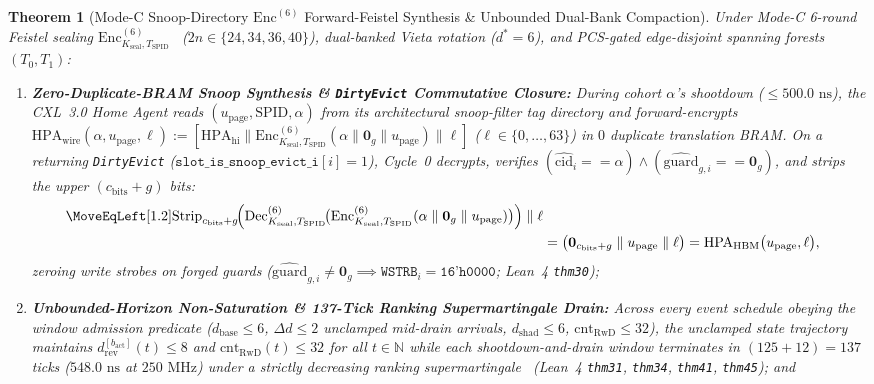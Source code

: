 \documentclass[11pt,letterpaper]{article}
\theoremstyle{spectralthm}
\newtheorem{theorem}{Theorem}[section]
\begin{document}
\begin{theorem}[Mode-C Snoop-Directory $\mathrm{Enc}^{(6)}$ Forward-Feistel Synthesis \& Unbounded Dual-Bank Compaction]
\label{thm:bijective_snoop_compaction}
Under Mode-C 6-round Feistel sealing $\mathrm{Enc}_{K_{\mathrm{seal}}, T_{\mathrm{SPID}}}^{(6)}$~\cite{luby1988construct} ($2n \in \{24,34,36,40\}$), dual-banked Vieta rotation ($d^* = 6$), and PCS-gated edge-disjoint spanning forests $(T_0, T_1)$:
\begin{enumerate}
  \item[(i)] \textbf{Zero-Duplicate-BRAM Snoop Synthesis \& \texttt{DirtyEvict} Commutative Closure:} During cohort $\alpha$'s shootdown ($\le 500.0\text{~ns}$), the CXL~3.0 Home Agent reads $(u_{\mathrm{page}}, \mathrm{SPID}, \alpha)$ from its architectural snoop-filter tag directory and forward-encrypts $\mathrm{HPA}_{\mathrm{wire}}(\alpha, u_{\mathrm{page}}, \ell) := [\mathrm{HPA}_{\mathrm{hi}} \parallel \mathrm{Enc}_{K_{\mathrm{seal}}, T_{\mathrm{SPID}}}^{(6)}(\alpha \parallel \mathbf{0}_g \parallel u_{\mathrm{page}}) \parallel \ell]$ ($\ell \in \{0,\ldots,63\}$) in $0$ duplicate translation BRAM. On a returning \texttt{DirtyEvict} ($\texttt{slot\_is\_snoop\_evict\_i}[i] = 1$), Cycle~0 decrypts, verifies $(\widehat{\mathrm{cid}}_i == \alpha) \wedge (\widehat{\mathrm{guard}}_{g,i} == \mathbf{0}_g)$, and strips the upper $(c_{\mathrm{bits}}+g)$ bits:
  \begin{equation}
  \label{eq:snoop_commute}
  \begin{aligned}
  \MoveEqLeft[1.2] \mathrm{Strip}_{c_{\mathrm{bits}}+g}\!\Bigl(\mathrm{Dec}_{K_{\mathrm{seal}}, T_{\mathrm{SPID}}}^{(6)}\!\bigl(\mathrm{Enc}_{K_{\mathrm{seal}}, T_{\mathrm{SPID}}}^{(6)}(\alpha \parallel \mathbf{0}_g \parallel u_{\mathrm{page}})\bigr)\Bigr) \parallel \ell\\
  &= \bigl(\mathbf{0}_{c_{\mathrm{bits}}+g} \parallel u_{\mathrm{page}} \parallel \ell\bigr)
  = \mathrm{HPA}_{\mathrm{HBM}}\bigl(u_{\mathrm{page}}, \ell\bigr),
  \end{aligned}
  \end{equation}
  zeroing write strobes on forged guards ($\widehat{\mathrm{guard}}_{g,i} \neq \mathbf{0}_g \implies \texttt{WSTRB}_i = \texttt{16'h0000}$; Lean~4 \texttt{thm30});
  \item[(ii)] \textbf{Unbounded-Horizon Non-Saturation \& 137-Tick Ranking Supermartingale Drain:} Across every event schedule obeying the window admission predicate ($d_{\mathrm{base}} \le 6$, $\Delta d \le 2$ unclamped mid-drain arrivals, $d_{\mathrm{shad}} \le 6$, $\mathrm{cnt}_{\mathrm{RwD}} \le 32$), the unclamped state trajectory maintains $d_{\mathrm{rev}}^{[b_{\mathrm{act}}]}(t) \le 8$ and $\mathrm{cnt}_{\mathrm{RwD}}(t) \le 32$ for all $t \in \mathbb{N}$ while each shootdown-and-drain window terminates in $(125 + 12) = 137$ ticks ($548.0\text{~ns}$ at $250\text{~MHz}$) under a strictly decreasing ranking supermartingale~\cite{chakarov2013probabilistic} (Lean~4 \texttt{thm31}, \texttt{thm34}, \texttt{thm41}, \texttt{thm45}); and

\end{enumerate}
\end{theorem}
\end{document}
